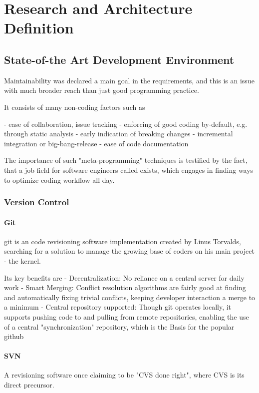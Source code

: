 \chapter{Research and Architecture Definition}

\section{State-of-the Art Development Environment}

Maintainability was declared a main goal in the requirements, and this is an issue with much broader reach than just good programming practice.

It consists of many non-coding factors such as

- ease of collaboration, issue tracking
- enforcing of good coding by-default, e.g. through static analysis
- early indication of breaking changes
- incremental integration or big-bang-release
- ease of code documentation

The importance of such "meta-programming" techniques is testified by the fact, that a job field for software engineers called  exists, which engages in finding ways to optimize coding workflow all day.

\subsection{Version Control}

\subsubsection{Git}
\gls{git} is an code revisioning software implementation created by Linus Torvalds, searching for a solution to manage the growing base of coders on his main project - the  kernel.

Its key benefits are
- Decentralization: No reliance on a central server for daily work
- Smart Merging: Conflict resolution algorithms are fairly good at finding and automatically fixing trivial conflicts, keeping developer interaction a merge to a minimum
- Central repository supported: Though git operates locally, it supports pushing code to and pulling from remote repositories, enabling the use of a central "synchronization" repository, which is the Basis for the popular \gls{github} 

\subsubsection{SVN}
A revisioning software once claiming to be "CVS done right", where CVS is its direct precursor.

